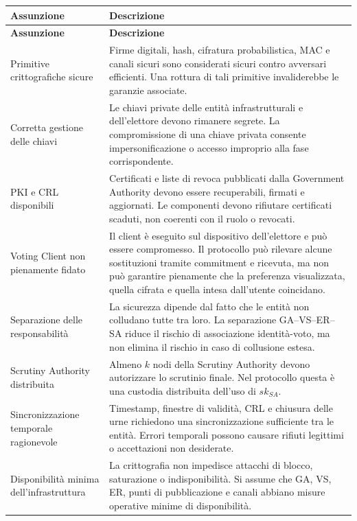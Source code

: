 \documentclass[a4paper,12pt]{article}
\begin{document}
\begin{longtable}{|>{\raggedright\arraybackslash}p{}|>{\raggedright\arraybackslash}p{}|}
    \hline
    \rowcolor{HeaderBlue}\textbf{Assunzione} & \textbf{Descrizione} \\
    \hline
    \endfirsthead
    \hline
    \rowcolor{HeaderBlue}\textbf{Assunzione} & \textbf{Descrizione} \\
    \hline
    \endhead
    Primitive crittografiche sicure & Firme digitali, hash, cifratura probabilistica, MAC e canali sicuri sono considerati sicuri contro avversari efficienti. Una rottura di tali primitive invaliderebbe le garanzie associate. \\
    \hline
    Corretta gestione delle chiavi & Le chiavi private delle entità infrastrutturali e dell'elettore devono rimanere segrete. La compromissione di una chiave privata consente impersonificazione o accesso improprio alla fase corrispondente. \\
    \hline
    PKI e CRL disponibili & Certificati e liste di revoca pubblicati dalla Government Authority devono essere recuperabili, firmati e aggiornati. Le componenti devono rifiutare certificati scaduti, non coerenti con il ruolo o revocati. \\
    \hline
    Voting Client non pienamente fidato & Il client è eseguito sul dispositivo dell'elettore e può essere compromesso. Il protocollo può rilevare alcune sostituzioni tramite commitment e ricevuta, ma non può garantire pienamente che la preferenza visualizzata, quella cifrata e quella intesa dall'utente coincidano. \\
    \hline
    Separazione delle responsabilità & La sicurezza dipende dal fatto che le entità non colludano tutte tra loro. La separazione GA--VS--ER--SA riduce il rischio di associazione identità-voto, ma non elimina il rischio in caso di collusione estesa. \\
    \hline
    Scrutiny Authority distribuita & Almeno \(k\) nodi della Scrutiny Authority devono autorizzare lo scrutinio finale. Nel protocollo questa è una custodia distribuita dell'uso di \(sk_{SA}\). \\
    \hline
    Sincronizzazione temporale ragionevole & Timestamp, finestre di validità, CRL e chiusura delle urne richiedono una sincronizzazione sufficiente tra le entità. Errori temporali possono causare rifiuti legittimi o accettazioni non desiderate. \\
    \hline
    Disponibilità minima dell'infrastruttura & La crittografia non impedisce attacchi di blocco, saturazione o indisponibilità. Si assume che GA, VS, ER, punti di pubblicazione e canali abbiano misure operative minime di disponibilità. \\
    \hline
\end{longtable}
\end{document}
